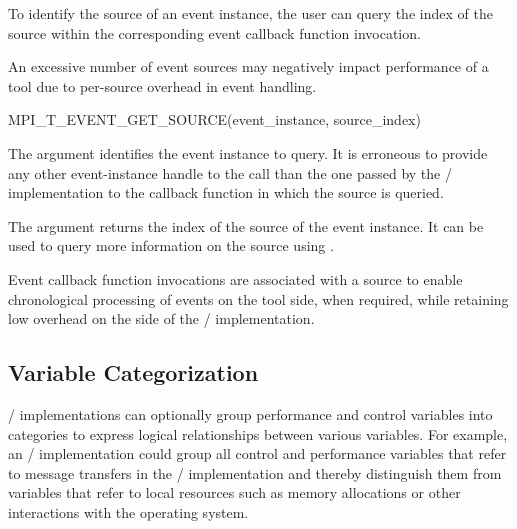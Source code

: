 To identify the source of an event instance, the user can query the index
of the source within the corresponding event callback
function invocation.

\begin{implementors}
    An excessive number of event sources may negatively impact performance
    of a tool due to per-source overhead in event handling.
\end{implementors}

\begin{funcdef}{MPI\_T\_EVENT\_GET\_SOURCE}{(\mbox{event\_instance}, \mbox{source\_index})}
\end{funcdef}

The  argument identifies the event instance to query. It
is erroneous to provide any other event-instance handle to the call than
the one passed by the \MPI/ implementation to the callback function in
which the source is queried.

The  argument returns the index of the source of the event instance.
It can be used to query more information on the source using
.

\begin{rationale}
    Event callback function invocations are associated with a source to enable
    chronological processing of events on the tool side, when required,
    while retaining low overhead on the side of the \MPI/ implementation.
\end{rationale}

\subsection{Variable Categorization}
\label{sec:mpit:cat}

\MPI/ implementations can optionally group performance and control
variables into categories to express logical relationships between various
variables.  For example, an \MPI/ implementation could group all control
and performance variables that refer to message transfers in the \MPI/
implementation and thereby distinguish them from variables that refer to
local resources such as memory allocations or other interactions with the
operating system.

